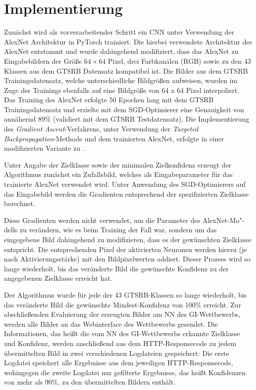\section{Implementierung}

Zunächst wird als vorverarbeitender Schritt ein \ac{CNN} unter Verwendung der AlexNet Architektur in PyTorch trainiert. 
Die hierbei verwendete Architektur des AlexNet entstammt \cite{pytorch_datasets_2019} und wurde dahingehend modifiziert, dass das AlexNet zu Eingabebildern der Größe $64 \times 64$ Pixel, drei Farbkanälen (RGB) sowie zu den 43 Klassen aus dem \ac{GTSRB} Datensatz kompatibel ist. 
Die Bilder aus dem \ac{GTSRB} Trainingsdatensatz, welche unterschiedliche Bildgrößen aufweisen, wurden im Zuge des Trainings ebenfalls auf eine Bildgröße von 64 x 64 Pixel interpoliert. 
Das Training des AlexNet erfolgte 50 Epochen lang mit dem \ac{GTSRB} Trainingsdatensatz und erzielte mit dem \ac{SGD}-Optimierer eine Genauigkeit von annähernd 89\% (validiert mit dem \ac{GTSRB} Testdatensatz).
Die Implementierung des \textit{Gradient Ascent}-Verfahrens, unter Verwendung der \textit{Targeted Backpropagation}-Methode und dem trainierten AlexNet, erfolgte in einer modifizierten Variante zu \cite{ozbulak_pytorch_2019}. 

Unter Angabe der Zielklasse sowie der minimalen Zielkonfidenz erzeugt der Algorithmus zunächst ein Zufallsbild, welches als Eingabeparameter für das trainierte AlexNet verwendet wird. Unter Anwendung des SGD-Optimierers auf das Eingabebild werden die Gradienten entsprechend der spezifizierten Zielklasse berechnet. 

Diese Gradienten werden nicht verwendet, um die Parameter des AlexNet-Mo"-dells zu verändern, wie es beim Training der Fall war, sondern um das eingegebene Bild dahingehend zu modifizieren, dass es der gewünschten Zielklasse entspricht. 
Die entsprechenden Pixel der aktivierten Neuronen werden hierzu (je nach Aktivierungsstärke) mit den Bildpixelwerten addiert. 
Dieser Prozess wird so lange wiederholt, bis das veränderte Bild die gewünschte Konfidenz zu der angegebenen Zielklasse erreicht hat.

Der Algorithmus wurde für jede der 43 \ac{GTSRB}-Klassen so lange wiederholt, bis das veränderte Bild die gewünschte Mindest-Konfidenz von 100\% erreicht.
Zur abschließenden Evaluierung der erzeugten Bilder am \ac{NN} des \ac{GI}-Wettbewerbs, werden alle Bilder an das Webinterface des Wettbewerbs gesendet. Die Informationen, das heißt die vom \ac{NN} des \ac{GI}-Wettbewerbs erkannte Zielklasse und Konfidenz, werden anschließend aus dem HTTP-Responsecode zu jedem übermittelten Bild in zwei verschiedenen Logdateien gespeichert: Die erste Logdatei speichert alle Ergebnisse aus dem jeweiligen HTTP-Responsecode, wohingegen die zweite Logdatei nur gefilterte Ergebnisse, das heißt Konfidenzen von mehr als 90\%, zu den übermittelten Bildern enthält.


